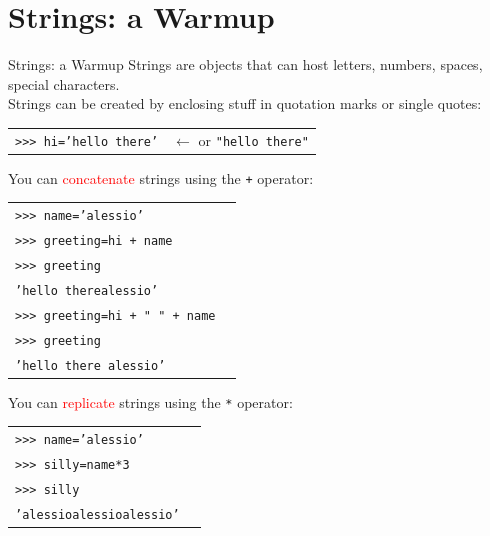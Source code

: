 \documentclass[t,handout,9pt]{beamer}
\begin{document}
\section{Strings: a Warmup}
\begin{frame}{Strings: a Warmup}
Strings are objects that can host letters, numbers, spaces, special characters.\\
Strings can be created by enclosing stuff in quotation marks or single quotes:
\begin{table}[]
\begin{tabular}{ll}
\texttt{>{}>{}> hi='hello there'} & $\leftarrow$ or \texttt{"hello there"}\\
\end{tabular}
\end{table}
You can \textcolor{red}{concatenate} strings using the \texttt{+} operator:
\begin{table}[]
\begin{tabular}{ll}
\texttt{>{}>{}> name='alessio'} & \\
\texttt{>{}>{}> greeting=hi + name} & \\
\texttt{>{}>{}> greeting} & \\
\texttt{'hello therealessio'} & \\
\texttt{>{}>{}> greeting=hi + " " + name} & \\
\texttt{>{}>{}> greeting} & \\
\texttt{'hello there alessio'} & \\
\end{tabular}
\end{table}
You can \textcolor{red}{replicate} strings using the \texttt{*} operator:
\begin{table}[]
\begin{tabular}{ll}
\texttt{>{}>{}> name='alessio'} & \\
\texttt{>{}>{}> silly=name*3} & \\
\texttt{>{}>{}> silly} & \\
\texttt{'alessioalessioalessio'} & \\
\end{tabular}
\end{table}
\end{frame}
%
\end{document}

